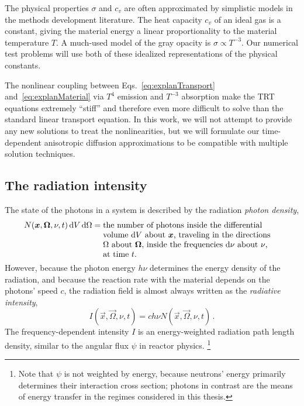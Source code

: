 The physical properties $\sigma$ and $c_v$ are often approximated by simplistic
models in the methods development literature. The heat capacity $c_v$ of an ideal
gas is a constant, giving the material energy a linear proportionality to
the material temperature $T$. A much-used model \cite{Mou2006,Wol2008} of the
gray opacity is $\sigma \propto T^{-3}$.
Our numerical test problems will use both of these idealized representations of
the physical constants.

The nonlinear coupling between Eqs.~\eqref{eq:explanTransport}
and~\eqref{eq:explanMaterial} via $T^4$ emission and $T^{-3}$ absorption make
the TRT equations extremely ``stiff'' \cite{Kno2003} and therefore even more
difficult to solve than the standard linear transport equation. In this work,
we will not attempt to provide any new solutions to treat the nonlinearities,
but we will formulate our time-dependent anisotropic diffusion approximations to
be compatible with multiple solution techniques.

\subsection{The radiation intensity}

The state of the photons in a system is described by the radiation
\emph{photon density},
\begin{align*}
  N(\vec{x},\vec{\Omega}, \nu, t) \ud V \ud \Omega
  &= \topbox{the number of photons inside the differential volume $\ud V$
  about $\vec{x}$, traveling in the directions $\Omega$ about
  $\vec{\Omega}$, inside the frequencies $\ud \nu$ about $\nu$, at time $t$.}
\end{align*}
However, because the photon energy $h\nu$ determines the energy
density of the radiation, and because the reaction rate with the material
depends on the photons' speed $c$, the radiation field is almost always written
as the \emph{radiative intensity},
\begin{equation*}
  I(\vec{x},\vec{\Omega},\nu, t) = c h\nu N(\vec{x},\vec{\Omega},\nu, t)\,.
\end{equation*}
The frequency-dependent intensity $I$ is an energy-weighted radiation path
length density, similar to the angular flux $\psi$ in reactor physics.%
\footnote{Note that $\psi$ is not weighted by energy, because neutrons' energy
primarily determines their interaction cross section; photons in contrast are
the means of energy transfer in the regimes considered in this thesis.}

